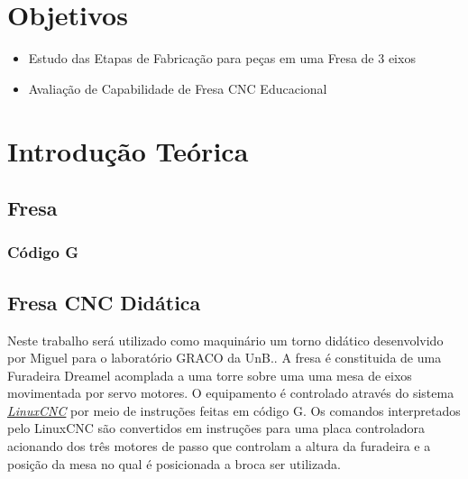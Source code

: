 \documentclass[a4paper,11pt]{article}
\title{\tituloRelatorio}
\begin{document}



\section{Objetivos}

\begin{itemize}
    \item Estudo das Etapas de Fabricação para peças em uma Fresa de 3 eixos
    \item Avaliação de Capabilidade de Fresa CNC Educacional
\end{itemize}

\section{Introdução Teórica}

\subsection{Fresa}


\subsubsection{Código G}

\subsection{Fresa CNC Didática}
Neste trabalho será utilizado como maquinário um torno didático desenvolvido por Miguel para o laboratório GRACO da UnB.\cite{mgutierrez_2013}. A fresa é constituida de uma Furadeira Dreamel acomplada a uma torre sobre uma uma mesa de eixos movimentada por servo motores. O equipamento é controlado através do sistema \hyperref[sec:linuxCNC]{\textit{LinuxCNC}} por meio de instruções feitas em código G. Os comandos interpretados pelo LinuxCNC são convertidos em instruções para uma placa controladora acionando dos três motores de passo  que controlam a altura da furadeira e a posição da mesa no qual é posicionada a broca ser utilizada.
\end{document}

